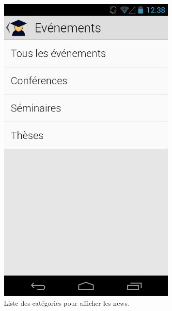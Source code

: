 \documentclass [pdftex,12pt] {report}
\begin{document}
\begin{figure}
  \begin{minipage}[t]{8cm}
    \centering
    \includegraphics[width=0.8\textwidth]{resources/ui_preview/05}
    \caption{Liste des catégories pour afficher les news.}
    \label{fig:05}
  \end{minipage}
  \hspace{+20pt}
  \begin{minipage}[t]{8cm}
    \centering

\end{minipage}
\end{figure}
\end{document}
